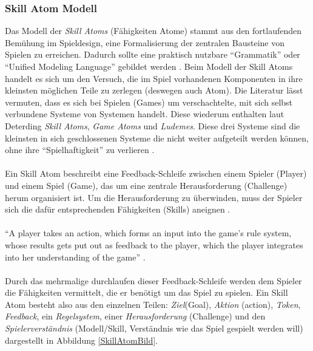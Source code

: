 \documentclass[a4paper,12pt]{scrartcl}
\begin{document}
\subsubsection{Skill Atom Modell}
Das Modell der \textit{Skill Atoms} (Fähigkeiten Atome) stammt aus den fortlaufenden
Bemühung im Spieldesign, eine Formalisierung der zentralen Bausteine von Spielen zu erreichen. Dadurch sollte eine praktisch nutzbare \enquote{Grammatik} oder \enquote{Unified Modeling Language} gebildet werden \cite{Deterding2013}. Beim Modell der Skill Atoms handelt es sich um den Versuch, die im Spiel vorhandenen Komponenten in ihre kleinsten möglichen Teile zu zerlegen (deswegen auch Atom). Die Literatur lässt vermuten, dass es sich bei Spielen (Games) um verschachtelte, mit sich selbst verbundene Systeme von Systemen handelt. Diese wiederum enthalten laut Deterding \textit{Skill Atoms}, \textit{Game Atoms} und \textit{Ludemes}. Diese drei Systeme sind die kleinsten in sich geschlossenen Systeme die nicht weiter aufgeteilt werden können, ohne ihre \enquote{Spielhaftigkeit} zu verlieren \cite{Deterding2013}.
\\\\
Ein Skill Atom beschreibt eine Feedback-Schleife zwischen einem Spieler (Player) und einem Spiel (Game), das um eine zentrale Herausforderung (Challenge) herum organisiert ist. Um die Herausforderung zu überwinden, muss der Spieler sich die dafür entsprechenden Fähigkeiten (Skills) aneignen \cite{SkillAtoms2006}.
\\\\
\enquote{A player takes an action, which forms an input into the game’s rule system, whose results gets put out as feedback to the player, which the player integrates into her understanding of the game} \cite{Deterding2013}.
\\\\
Durch das mehrmalige durchlaufen dieser Feedback-Schleife werden dem Spieler die Fähigkeiten vermittelt, die er benötigt um das Spiel zu spielen. Ein Skill Atom besteht also aus den einzelnen Teilen: \textit{Ziel}(Goal), \textit{Aktion} (action), \textit{Token}, \textit{Feedback}, ein \textit{Regelsystem}, einer \textit{Herausforderung} (Challenge) und den \textit{Spielerverständnis} (Modell/Skill, Verständnis wie das Spiel gespielt werden will) dargestellt in Abbildung \ref{SkillAtomBild}.    
\\
\end{document}
